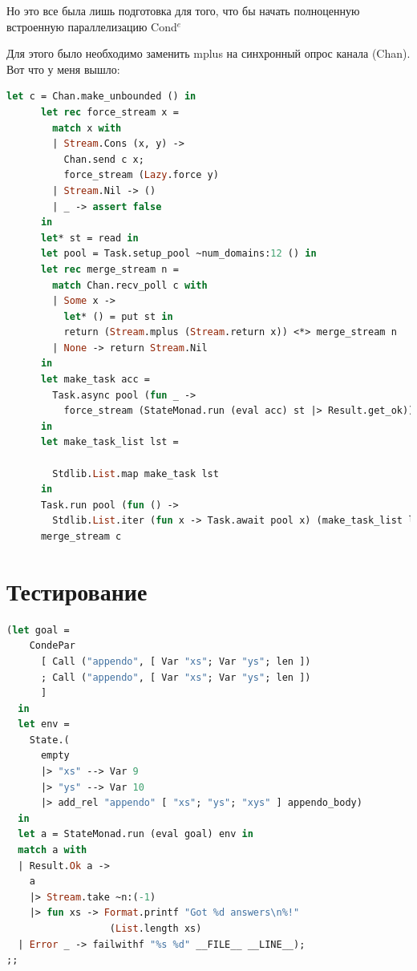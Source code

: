 Но это все была лишь подготовка для того, что бы начать полноценную встроенную параллелизацию Cond$^e$ 

Для этого было необходимо заменить mplus на синхронный опрос канала (Chan). Вот что у меня вышло:

\begin{lstlisting}[caption=Parallel Cond$^e$, language=OCaml, frame=single]
  let c = Chan.make_unbounded () in
      let rec force_stream x =
        match x with
        | Stream.Cons (x, y) ->
          Chan.send c x;
          force_stream (Lazy.force y)
        | Stream.Nil -> ()
        | _ -> assert false
      in
      let* st = read in
      let pool = Task.setup_pool ~num_domains:12 () in
      let rec merge_stream n =
        match Chan.recv_poll c with
        | Some x ->
          let* () = put st in
          return (Stream.mplus (Stream.return x)) <*> merge_stream n
        | None -> return Stream.Nil
      in
      let make_task acc =
        Task.async pool (fun _ ->
          force_stream (StateMonad.run (eval acc) st |> Result.get_ok))
      in
      let make_task_list lst =

        Stdlib.List.map make_task lst
      in
      Task.run pool (fun () ->
        Stdlib.List.iter (fun x -> Task.await pool x) (make_task_list lst));
      merge_stream c
\end{lstlisting}


\section{Тестирование}

\begin{lstlisting}[caption=Tests, language=OCaml, frame=single]
  (let goal =
    CondePar
      [ Call ("appendo", [ Var "xs"; Var "ys"; len ])
      ; Call ("appendo", [ Var "xs"; Var "ys"; len ])
      ]
  in
  let env =
    State.(
      empty
      |> "xs" --> Var 9
      |> "ys" --> Var 10
      |> add_rel "appendo" [ "xs"; "ys"; "xys" ] appendo_body)
  in
  let a = StateMonad.run (eval goal) env in
  match a with
  | Result.Ok a ->
    a
    |> Stream.take ~n:(-1)
    |> fun xs -> Format.printf "Got %d answers\n%!" 
                  (List.length xs)
  | Error _ -> failwithf "%s %d" __FILE__ __LINE__);
;;
\end{lstlisting}

